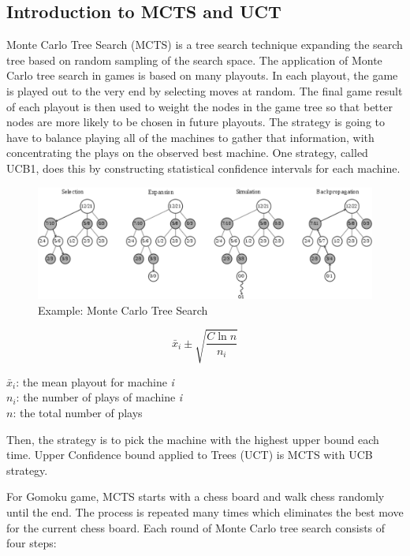 \documentclass[11pt,a4paper]{article}
\begin{document}
\subsection{Introduction to MCTS and UCT}
\par Monte Carlo Tree Search (MCTS) is a tree search technique expanding the search tree based on random sampling of the search space. The application of Monte Carlo tree search in games is based on many playouts. In each playout, the game is played out to the very end by selecting moves at random. The final game result of each playout is then used to weight the nodes in the game tree so that better nodes are more likely to be chosen in future playouts. The strategy is going to have to balance playing all of the machines to gather that information, with concentrating the plays on the observed best machine. One strategy, called UCB1, does this by constructing statistical confidence intervals for each machine.

\begin{figure}[!ht]
\centering\includegraphics[width=6in]{1.png}
\caption{Example: Monte Carlo Tree Search}
\end{figure}

\begin{displaymath}
\bar{x}_i \pm \sqrt{\frac{C\ln n}{n_i}}
\end{displaymath}
\begin{center}
$\bar{x}_i$: the mean playout for machine \emph{i}\\
$n_i$: the number of plays of machine \emph{i} \\
$n$: the total number of plays
\end{center}
Then, the strategy is to pick the machine with the highest upper bound each time. Upper Confidence bound applied to Trees (UCT)
is MCTS with UCB strategy.
\par For Gomoku game, MCTS starts with a chess board and walk chess randomly until the end. The process is repeated many times which eliminates the best move for the current chess board. Each round of Monte Carlo tree search consists of four steps:
\end{document}
